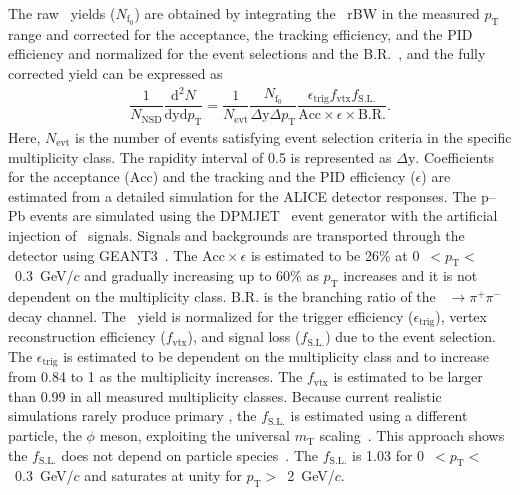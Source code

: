 The raw \fzero~yields ($N_{\mathrm{f}_{0}}$) are obtained by integrating the \fzero~rBW in the measured $p_{\mathrm{T}}$ range and corrected for the acceptance, the tracking efficiency, and the PID efficiency and normalized for the event selections and the B.R.~\cite{Stone:2013eaa}, and the fully corrected yield can be expressed as
\begin{eqnarray}
\dfrac{1}{N_{\mathrm{NSD}}}\dfrac{\mathrm{d}^{2}N}{\mathrm{dyd}p_{\mathrm{T}}} = \dfrac{1}{N_{\mathrm{evt}}} \dfrac{ N_{\mathrm{f}_{0}} }{ \Delta \mathrm{y} \Delta p_{\mathrm{T}} } \dfrac{  \epsilon_{\mathrm{trig}} f_{\mathrm{vtx}} f_{\mathrm{S.L.}} }{\mathrm{Acc} \times \epsilon \times \mathrm{B.R.} }.
\end{eqnarray}
Here, $N_{\mathrm{evt}}$ is the number of events satisfying event selection criteria in the specific multiplicity class. The rapidity interval of 0.5 is represented as $\Delta \mathrm{y}$. Coefficients for the acceptance ($\mathrm{Acc}$) and the tracking and the PID efficiency ($\epsilon$) are estimated from a detailed simulation for the ALICE detector responses. The p--Pb events are simulated using the DPMJET~\cite{Fedynitch:2015kcn} event generator with the artificial injection of \fzero~signals. Signals and backgrounds are transported through the detector using GEANT3~\cite{Brun:1994aa}. The $\mathrm{Acc}\times\epsilon$ is estimated to be 26\% at 0~$<p_{\mathrm{T}}<$~0.3~GeV/$c$ and gradually increasing up to 60\% as $p_{\mathrm{T}}$ increases and it is not dependent on the multiplicity class. $\mathrm{B.R.}$ is the branching ratio of the \fzero~$\rightarrow \pi^{+}\pi^{-}$ decay channel. The \fzero~yield is normalized for the trigger efficiency ($\epsilon_{\mathrm{trig}}$), vertex reconstruction efficiency ($f_{\mathrm{vtx}}$), and signal loss ($f_{\mathrm{S.L.}}$) due to the event selection. The $\epsilon_{\mathrm{trig}}$ is estimated to be dependent on the multiplicity class and to increase from 0.84 to 1 as the multiplicity increases. The $f_{\mathrm{vtx}}$ is estimated to be larger than 0.99 in all measured multiplicity classes. Because current realistic simulations rarely produce primary \fzero, the $f_{\mathrm{S.L.}}$ is estimated using a different particle, the $\phi$ meson, exploiting the universal $m_{\mathrm{T}}$ scaling~\cite{Altenkamper:2017qot}. This approach shows the $f_{\mathrm{S.L.}}$ does not depend on particle species~\cite{ALICE:2019xyr}. The $f_{\mathrm{S.L.}}$ is 1.03 for 0~$<p_{\mathrm{T}}<$~0.3~GeV/$c$ and saturates at unity for $p_{\mathrm{T}}>$~2~GeV/$c$.

